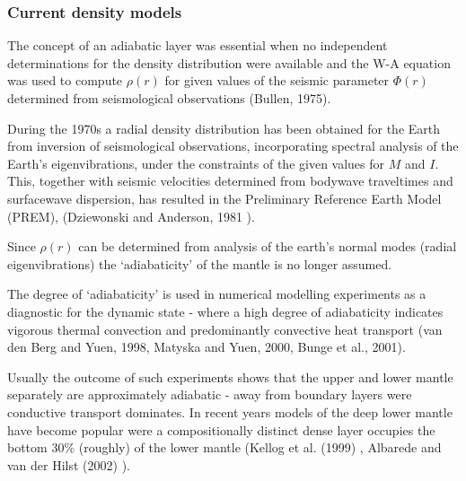 \subsubsection{Current density models}
The concept of an adiabatic layer was essential when no independent
determinations for the density distribution were available and the
W-A equation was used to compute $\rho(r)$ for given values of the
seismic parameter $\Phi(r)$ determined from seismological
observations (Bullen, 1975).

During the 1970s
a radial density distribution has been obtained for the Earth from
inversion of seismological observations,
incorporating spectral analysis of the Earth's eigenvibrations,
under the constraints of the given values for $M$ and $I$. 
This, together with seismic velocities determined from bodywave
traveltimes and surfacewave dispersion, 
has resulted in the Preliminary Reference Earth Model
(PREM), (Dziewonski and Anderson, 1981 \cite{dzan81}).

Since $\rho(r)$ can be determined from analysis of the earth's 
normal modes (radial eigenvibrations) the `adiabaticity' 
of the mantle is no longer assumed.

The degree of `adiabaticity' is used in numerical modelling experiments
as a diagnostic for the dynamic state - where a high degree of 
adiabaticity indicates vigorous thermal convection and predominantly
convective heat transport
(van den Berg and Yuen, 1998, \cite{vayu98}
Matyska and Yuen, 2000, \cite{mayu00}
Bunge et al., 2001).

Usually the outcome of such experiments shows that the upper and lower
mantle separately are approximately adiabatic - away from boundary
layers were conductive transport dominates.
In recent years models of the deep lower mantle have become
popular were a compositionally distinct dense layer occupies the bottom
30\% (roughly) of the lower mantle 
(Kellog et al. (1999) \cite{kehv99}, Albarede and van der Hilst (2002) \cite{alva02}).



